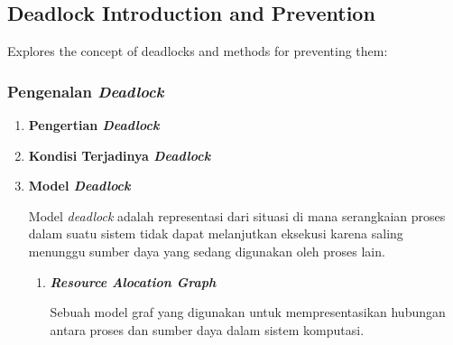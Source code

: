 \documentclass[12pt]{article}
\begin{document}
\subsection{Deadlock Introduction and Prevention}
Explores the concept of deadlocks and methods for preventing them:
\begin{itemize}
    \subsubsection{Pengenalan \textit{Deadlock}}
        \begin{enumerate}
            \item \textbf{Pengertian \textit{Deadlock}}
            \item \textbf{Kondisi Terjadinya \textit{Deadlock}}
            \item \textbf{Model \textit{Deadlock}}

                \hspace{1cm}
                Model \textit{deadlock} adalah representasi dari situasi di mana serangkaian proses dalam suatu sistem tidak dapat melanjutkan eksekusi karena saling menunggu sumber daya yang sedang digunakan oleh proses lain.\newline
                
                \begin{enumerate}
                    \item \textit{\textbf{Resource Alocation Graph}}

                        \hspace{1cm}
                        Sebuah model graf yang digunakan untuk mempresentasikan hubungan antara proses dan sumber daya dalam sistem komputasi.


\end{enumerate}
\end{enumerate}
\end{itemize}
\end{document}
